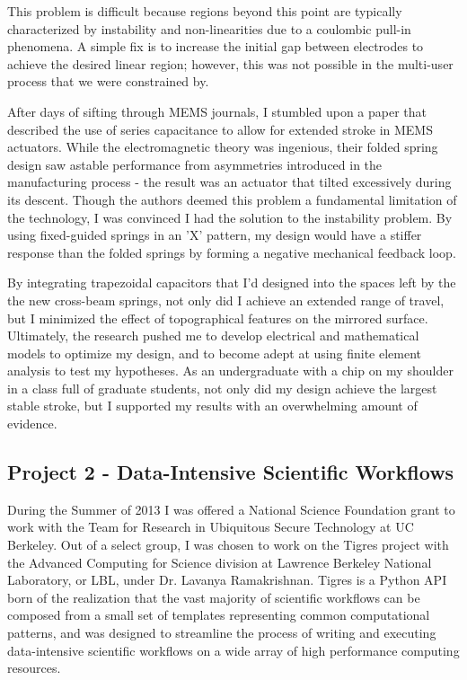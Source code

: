 \documentclass[journal]{IEEEtran}
\begin{document}
This problem is difficult because regions beyond this point are typically characterized by instability and non-linearities due to a coulombic pull-in phenomena. A simple fix is to increase the initial gap between electrodes to achieve the desired linear region; however, this was not possible in the multi-user process that we were constrained by. 

After days of sifting through MEMS journals, I stumbled upon a paper that described the use of series capacitance to allow for extended stroke in MEMS actuators. While the electromagnetic theory was ingenious, their folded spring design saw astable performance from asymmetries introduced in the manufacturing process - the result was an actuator that tilted excessively during its descent. Though the authors deemed this problem a fundamental limitation of the technology, I was convinced I had the solution to the instability problem. By using fixed-guided springs in an 'X' pattern, my design would have a stiffer response than the folded springs by forming a negative mechanical feedback loop. 

By integrating trapezoidal capacitors that I'd designed into the spaces left by the the new cross-beam springs, not only did I achieve an extended range of travel, but I minimized the effect of topographical features on the mirrored surface. Ultimately, the research pushed me to develop electrical and mathematical models to optimize my design, and to become adept at using finite element analysis to test my hypotheses. As an undergraduate with a chip on my shoulder in a class full of graduate students, not only did my design achieve the largest stable stroke, but I supported my results with an overwhelming amount of evidence.  

\subsection{Project 2 - Data-Intensive Scientific Workflows}
During the Summer of 2013 I was offered a National Science Foundation grant to work with the Team for Research in Ubiquitous Secure Technology at UC Berkeley. Out of a select group, I was chosen to work on the Tigres project with the Advanced Computing for Science division at Lawrence Berkeley National Laboratory, or LBL, under Dr. Lavanya Ramakrishnan. Tigres is a Python API born of the realization that the vast majority of scientific workflows can be composed from a small set of templates representing common computational patterns, and was designed to streamline the process of writing and executing data-intensive scientific workflows on a wide array of high performance computing resources.
\end{document}
